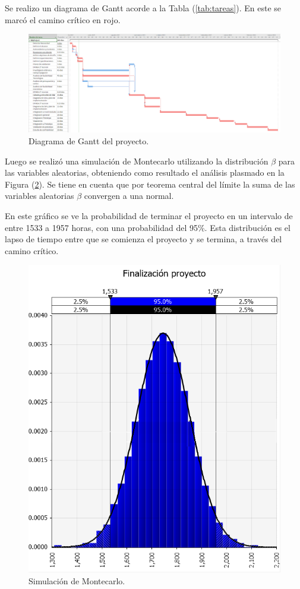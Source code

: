 Se realizo un diagrama de Gantt acorde a la Tabla (\ref{tab:tareas}). En este se marcó el camino crítico en rojo.
\begin{figure}[H]
	\centering
	\includegraphics[width=1\linewidth]{ImagenesFactibilidad/project}
	\caption{Diagrama de Gantt del proyecto.}							\label{fig:gantt}
\end{figure}

Luego se realizó una simulación de Montecarlo utilizando la distribución $\beta$ para las variables aleatorias, obteniendo como resultado el análisis plasmado en la Figura (\ref{fig:montecarlo_tiempos}). Se tiene en cuenta que por teorema central del límite la suma de las variables aleatorias $\beta$ convergen a una normal.

En este gráfico se ve la probabilidad de terminar el proyecto en un intervalo de entre 1533 a 1957 horas, con una probabilidad del 95\%. Esta distribución es el lapso de tiempo entre que se comienza el proyecto y se termina, a través del camino crítico.

\begin{figure}[H]
	\centering
	\includegraphics[width=0.5\linewidth]{ImagenesFactibilidad/montecarlo}
	\caption{Simulación de Montecarlo.}	
	\label{fig:montecarlo_tiempos}
\end{figure}



